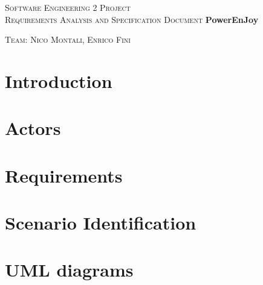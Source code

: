 \documentclass[a4paper,12pt,oneside]{book}
\begin{document}
	
	\pagestyle{empty}\centering
	\textsc{\Large Software Engineering 2 Project\\}
	\textsc{Requirements Analysis and Specification Document}
	\vfill
	\textbf{\Huge PowerEnJoy}
	
	\vfill
	\textsc{\Large Team: Nico Montali, Enrico Fini}
	
	\tableofcontents

	\begin{flushleft}
	\chapter{Introduction}\label{cap:Intro}
	
	\chapter{Actors}\label{cap:Actors}
	
	\chapter{Requirements}\label{cap:Requirements}
	
	\chapter{Scenario Identification}\label{cap:ScenarioIdentifying}
	
	\chapter{UML diagrams}\label{cap:UML}
	
	\end{flushleft}
\end{document}
